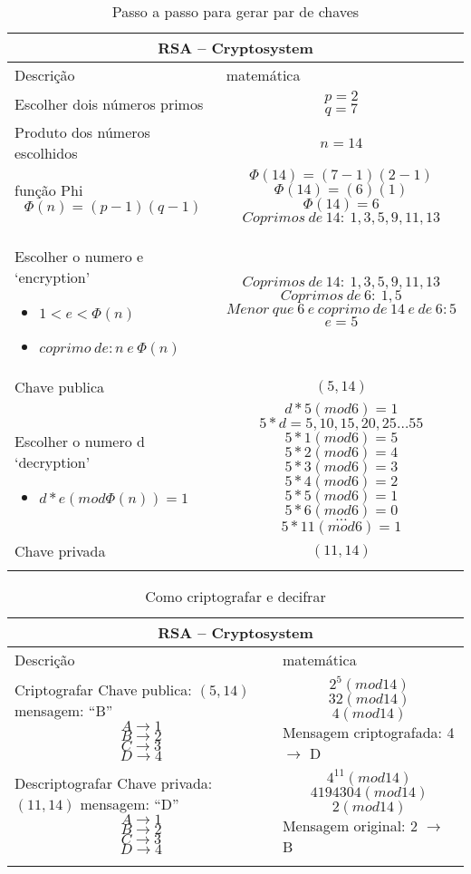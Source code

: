 \vspace{1cm}
\begin{longtable}{ |p{6cm}|| p{8cm}|  }
  \hline
  \multicolumn{2}{|c|}{RSA – Cryptosystem} \\
  \hline
    Descrição & matemática\\
  \hline
    Escolher dois números primos & 
    \[p=2\] \[q=7\]\\
  \hline
    Produto dos números escolhidos & 
    \[n=14\]\\
  \hline
    função Phi 
    \[\Phi(n)=(p-1)(q-1)\] & 
    \[\Phi(14)=(7-1)(2-1)\]
    \[\Phi(14)=(6)(1)\]
    \[\Phi(14)=6\]
    \[Coprimos\: de\: 14:\: 1, 3, 5, 9, 11, 13\]\\
  \hline
    Escolher o numero e `encryption'
    \begin{itemize}
      \item $1 < e < \Phi(n)$
      \item $coprimo\: de: n\: e\: \Phi(n)$
    \end{itemize} &
    \[Coprimos\: de\: 14:\: 1, 3, 5, 9, 11, 13\]
    \[Coprimos\: de\: 6:\: 1, 5\]
    \[Menor\: que\: 6\: e\: coprimo\: de\: 14\: e\: de\: 6: 5\]
    \[e = 5\]\\
  \hline
    Chave publica & 
    \[(5, 14)\]\\
  \hline
  Escolher o numero d `decryption'
    \begin{itemize}
      \item $d * e (mod \Phi(n)) = 1$
    \end{itemize} & 
    \[d * 5 (mod 6) = 1\]
    \[5*d = 5, 10, 15, 20, 25 \dots 55\]
    \[5*1 (mod 6) = 5\]
    \[5*2 (mod 6) = 4\]
    \[5*3 (mod 6) = 3\]
    \[5*4 (mod 6) = 2\]
    \[5*5 (mod 6) = 1\]
    \[5*6 (mod 6) = 0\]
    \[ \dots \]
    \[5*11 (mod 6) = 1\] \\
  \hline
  Chave privada & 
  \[(11, 14)\]\\
  \hline
  \caption{Passo a passo para gerar par de chaves}
  \label{table:3}
\end{longtable}

\vspace{1cm}
\begin{longtable}{ |p{6cm}|| p{8cm}|  }
  \hline
  \multicolumn{2}{|c|}{RSA – Cryptosystem} \\
  \hline
    Descrição & matemática\\
  \hline
    Criptografar \newline
    Chave publica: $(5, 14)$ \newline
    mensagem: ``B'' 
    \[A \to 1\]
    \[B \to 2\]
    \[C \to 3\]
    \[D \to 4\] & 
    \[2^5(mod 14)\]
    \[32(mod 14)\]
    \[4(mod 14)\]
    Mensagem criptografada: 4 $\to$ D\\
  \hline
    Descriptografar \newline
    Chave privada: $(11, 14)$ \newline
    mensagem: ``D'' 
    \[A \to 1\]
    \[B \to 2\]
    \[C \to 3\]
    \[D \to 4\] & 
    \[4^{11}(mod 14)\]
    \[4194304(mod 14)\]
    \[2(mod 14)\]
    Mensagem original: 2 $\to$ B\\
  \hline
  \caption{Como criptografar e decifrar}
  \label{table:4}
\end{longtable}

